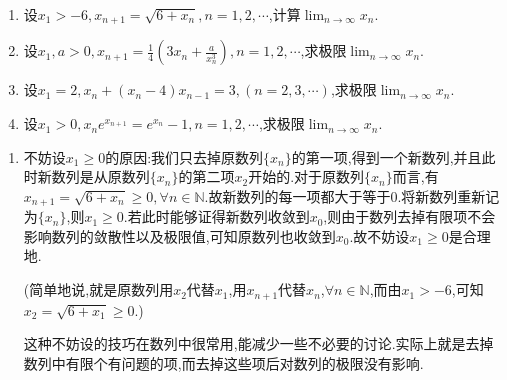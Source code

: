 \documentclass[../../main.tex]{subfiles}
\begin{document}
\begin{example}[$\,\,$递增/递减递推数列]
\begin{enumerate}
\item 设\(x_1 > - 6,x_{n + 1} = \sqrt{6 + x_n},n = 1,2,\cdots\),计算\(\lim_{n \to \infty} x_n\).
\item 设\(x_1,a > 0,x_{n + 1} = \frac{1}{4}(3x_n+\frac{a}{x_n^3}),n = 1,2,\cdots\),求极限\(\lim_{n \to \infty} x_n\).
\item 设\(x_1 = 2,x_n+(x_n - 4)x_{n - 1} = 3,(n = 2,3,\cdots)\),求极限\(\lim_{n \to \infty} x_n\).
\item 设\(x_1 > 0,x_n e^{x_{n + 1}} = e^{x_n}-1,n = 1,2,\cdots\),求极限\(\lim_{n \to \infty} x_n\).
\end{enumerate}
\end{example}
\begin{note}
\begin{enumerate}
\item 不妨设$x_1\geqslant  0$的原因:我们只去掉原数列$\{x_n\}$的第一项,得到一个新数列,并且此时新数列是从原数列$\{x_n\}$的第二项$x_2$开始的.对于原数列$\{x_n\}$而言,有$x_{n+1}=\sqrt{6+x_n}\geqslant  0,\forall n \in \mathbb{N}$.故新数列的每一项都大于等于0.将新数列重新记为$\{x_n\}$,则$x_1\geqslant  0$.若此时能够证得新数列收敛到$x_0$,则由于数列去掉有限项不会影响数列的敛散性以及极限值,可知原数列也收敛到$x_0$.故不妨设$x_1\geqslant  0$是合理地.

(简单地说,就是原数列用$x_2$代替$x_1$,用$x_{n+1}$代替$x_n$,$\forall n \in \mathbb{N}$,而由$x_1>-6$,可知$x_2=\sqrt{6+x_1}\geqslant  0$.)

\begin{remark}
{\color{blue}这种不妨设的技巧在数列中很常用,能减少一些不必要的讨论.实际上就是去掉数列中有限个有问题的项,而去掉这些项后对数列的极限没有影响.}
\end{remark}
\end{enumerate}
\end{note}
\end{document}
